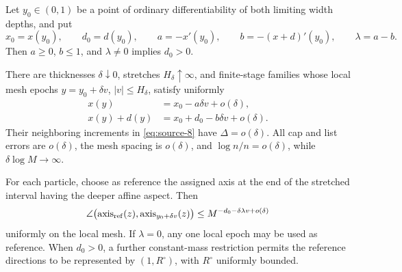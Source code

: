 \begin{lemma}
\label{geo:calibration}
Let \(y_0\in(0,1)\) be a point of ordinary differentiability
of both limiting width depths, and put
\[
x_0=x(y_0),\qquad d_0=d(y_0),\qquad
a=-x'(y_0),\qquad b=-(x+d)'(y_0),\qquad
\lambda=a-b.
\]
Then \(a\ge0\), \(b\le1\), and
\(\lambda\ne0\) implies \(d_0>0\).

There are thicknesses \(\delta\downarrow0\), stretches
\(H_\delta\uparrow\infty\), and finite-stage families
whose local mesh epochs \(y=y_0+\delta v\),
\(|v|\le H_\delta\), satisfy uniformly
\begin{equation}\label{geo:affine-widths}
\begin{split}
x(y)&=x_0-a\delta v+o(\delta),\\
x(y)+d(y)&=x_0+d_0-b\delta v+o(\delta).
\end{split}
\end{equation}
Their neighboring increments in \eqref{eq:source-8}
have \(\Delta=o(\delta)\).  All cap and list errors are
\(o(\delta)\), the mesh spacing is \(o(\delta)\), and
\(\log n/n=o(\delta)\), while \(\delta\log M\to\infty\).

For each particle, choose as reference the assigned
axis at the end of the stretched interval having
the deeper affine aspect.  Then
\begin{equation}\label{geo:reference-axis}
\angle\bigl(\operatorname{axis}_{\rm ref}(z),
            \operatorname{axis}_{y_0+\delta v}(z)\bigr)
\le M^{-d_0-\delta\lambda v+o(\delta)}
\end{equation}
uniformly on the local mesh.  If \(\lambda=0\), any
one local epoch may be used as reference.  When
\(d_0>0\), a further constant-mass restriction permits
the reference directions to be represented by
\((1,R^\circ)\), with \(R^\circ\) uniformly bounded.
\end{lemma}

